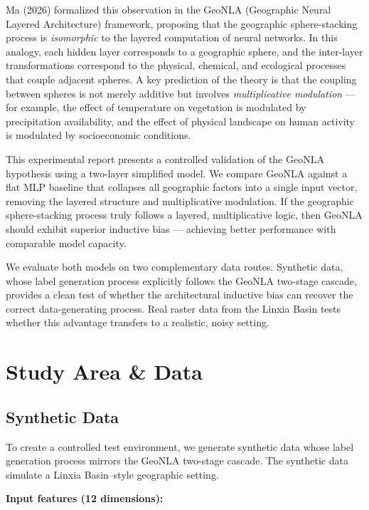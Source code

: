 \documentclass[a4paper,11pt]{article}
\begin{document}
Ma (2026) formalized this observation in the GeoNLA (Geographic Neural Layered Architecture) framework, proposing that the geographic sphere-stacking process is \emph{isomorphic} to the layered computation of neural networks. In this analogy, each hidden layer corresponds to a geographic sphere, and the inter-layer transformations correspond to the physical, chemical, and ecological processes that couple adjacent spheres. A key prediction of the theory is that the coupling between spheres is not merely additive but involves \emph{multiplicative modulation} --- for example, the effect of temperature on vegetation is modulated by precipitation availability, and the effect of physical landscape on human activity is modulated by socioeconomic conditions.

This experimental report presents a controlled validation of the GeoNLA hypothesis using a two-layer simplified model. We compare GeoNLA against a flat MLP baseline that collapses all geographic factors into a single input vector, removing the layered structure and multiplicative modulation. If the geographic sphere-stacking process truly follows a layered, multiplicative logic, then GeoNLA should exhibit superior inductive bias --- achieving better performance with comparable model capacity.

We evaluate both models on two complementary data routes. Synthetic data, whose label generation process explicitly follows the GeoNLA two-stage cascade, provides a clean test of whether the architectural inductive bias can recover the correct data-generating process. Real raster data from the Linxia Basin tests whether this advantage transfers to a realistic, noisy setting.

\section{Study Area \& Data}
\label{sec:study_area}

\subsection{Synthetic Data}
\label{subsec:synthetic_data}

To create a controlled test environment, we generate synthetic data whose label generation process mirrors the GeoNLA two-stage cascade. The synthetic data simulate a Linxia Basin--style geographic setting.

\textbf{Input features (12 dimensions):}
\end{document}
